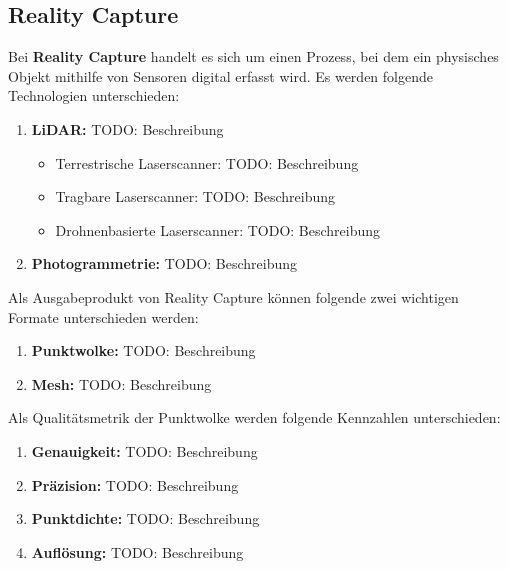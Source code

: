 \subsection{Reality Capture}
\begin{German}
    Bei \textbf{Reality Capture} handelt es sich um einen Prozess, bei dem ein physisches Objekt mithilfe von Sensoren digital erfasst wird. Es werden folgende Technologien unterschieden: \cite{rashdiScanningTechnologiesBuilding2022}

    \begin{enumerate}
        \item \textbf{LiDAR:} TODO: Beschreibung
        \begin{itemize}
            \item Terrestrische Laserscanner: TODO: Beschreibung 
            \item Tragbare Laserscanner: TODO: Beschreibung
            \item Drohnenbasierte Laserscanner: TODO: Beschreibung
        \end{itemize}
        \item \textbf{Photogrammetrie:} TODO: Beschreibung
    \end{enumerate}

    Als Ausgabeprodukt von Reality Capture können folgende zwei wichtigen Formate unterschieden werden:

    \begin{enumerate}
        \item \textbf{Punktwolke:} TODO: Beschreibung
        \item \textbf{Mesh:} TODO: Beschreibung
    \end{enumerate}

    Als Qualitätsmetrik der Punktwolke werden folgende Kennzahlen unterschieden:

    \begin{enumerate}
        \item \textbf{Genauigkeit:} TODO: Beschreibung
        \item \textbf{Präzision:} TODO: Beschreibung
        \item \textbf{Punktdichte:} TODO: Beschreibung
        \item \textbf{Auflösung:} TODO: Beschreibung
    \end{enumerate}

\end{German}

